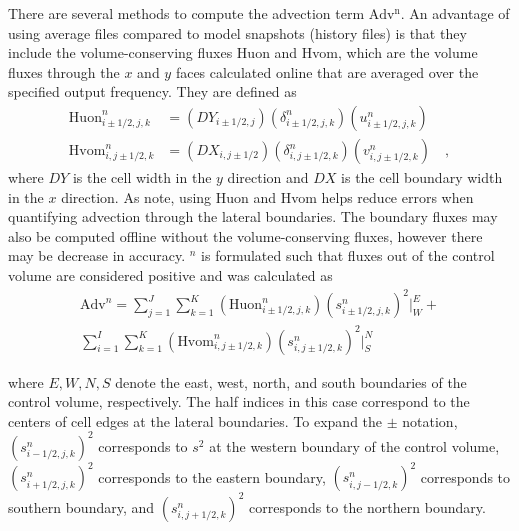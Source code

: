 There are several methods to compute the advection term $\mathrm{Adv^n}$. An advantage of using average files compared to model snapshots (history files) is that they include the volume-conserving fluxes Huon and Hvom, which are the volume fluxes through the $x$ and $y$ faces calculated online that are averaged over the specified output frequency. They are defined as
\begin{equation}
        \begin{split}
        \mathrm{Huon}_{i \pm 1/2,j,k}^n & = \left(DY_{i\pm 1/2,j} \right) \left(\delta_{i\pm 1/2,j,k}^n \right) \left(u_{i\pm 1/2,j,k}^n \right) \\
        \mathrm{Hvom}_{i,j \pm 1/2,k}^n & = \left(DX_{i,j\pm 1/2}\right)\left(\delta_{i,j\pm 1/2,k}^n\right)\left(v_{i,j\pm 1/2,k}^n\right) \quad ,
        \end{split}
\end{equation}
where $DY$ is the cell width in the $y$ direction and $DX$ is the cell boundary width in the $x$ direction. As \cite{MacCready_2016} note, using Huon and Hvom helps reduce errors when quantifying advection through the lateral boundaries. The boundary fluxes may also be computed offline without the volume-conserving fluxes, however there may be decrease in accuracy. $^n$ is formulated such that fluxes out of the control volume are considered positive and was calculated as 
\begin{equation} \label{eq:append_adv}
        \begin{split}
        \mathrm{Adv}^n = \sum_{j=1}^{J}\sum_{k=1}^{K}\left(\text{Huon}_{i \pm 1/2, j,k}^n \right) \left(s_{i \pm 1/2,j,k}^{n} \right)^2 \bigg|_{W}^{E}+ \\ 
        \sum_{i=1}^{I}\sum_{k=1}^{K} \left(\text{Hvom}_{i,j \pm 1/2,k}^n \right) \left(s_{i,j \pm 1/2,k}^{n} \right)^2 \bigg|_{S}^{N}
        \end{split}    
\end{equation}

where $E,W,N,S$ denote the east, west, north, and south boundaries of the control volume, respectively. The half indices in this case correspond to the centers of cell edges at the lateral boundaries. To expand the $\pm$ notation, $(s_{i-1/2,j,k}^{n})^2$ corresponds to $s^2$ at the western boundary of the control volume, $(s_{i+1/2,j,k}^{n})^2$ corresponds to the eastern boundary, $(s_{i,j-1/2,k}^{n})^2$ corresponds to southern boundary, and $(s_{i,j+1/2,k}^{n})^2$ corresponds to the northern boundary. 

